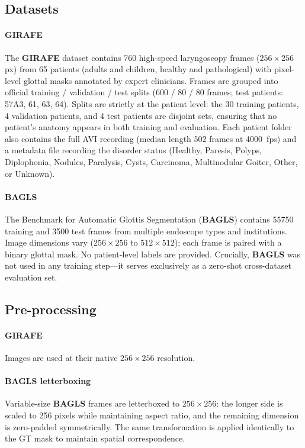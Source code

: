 \documentclass[preprint,12pt]{elsarticle}
\newcommand{\girafe}{\textbf{GIRAFE}}
\newcommand{\bagls}{\textbf{BAGLS}}
\begin{document}
\subsection{Datasets}
\label{sec:datasets}

\paragraph{\girafe{}}
The \girafe{} dataset \cite{andrade2025datainbrief} contains \num{760}
high-speed laryngoscopy frames (\(256\times256\) px) from \num{65} patients
(adults and children, healthy and pathological) with pixel-level glottal masks
annotated by expert clinicians.
Frames are grouped into official training / validation / test splits (\num{600}
/ \num{80} / \num{80} frames; test patients: 57A3, 61, 63, 64).
Splits are strictly at the patient level: the \num{30} training patients,
\num{4} validation patients, and \num{4} test patients are disjoint sets,
ensuring that no patient's anatomy appears in both training and evaluation.
Each patient folder also contains the full AVI recording (median length
\num{502} frames at \SI{4000}{fps}) and a metadata file recording the disorder
status (Healthy, Paresis, Polyps, Diplophonia, Nodules, Paralysis, Cysts,
Carcinoma, Multinodular Goiter, Other, or Unknown).

\paragraph{\bagls{}}
The Benchmark for Automatic Glottis Segmentation (\bagls{}) \cite{gomez2020bagls}
contains \num{55750} training and \num{3500} test frames from multiple
endoscope types and institutions.
Image dimensions vary (\(256\times256\) to \(512\times512\)); each frame is
paired with a binary glottal mask.
No patient-level labels are provided.
Crucially, \bagls{} was not used in any training step---it serves exclusively
as a zero-shot cross-dataset evaluation set.

\subsection{Pre-processing}
\label{sec:preproc}

\paragraph{\girafe{}}
Images are used at their native \(256\times256\) resolution.

\paragraph{\bagls{} letterboxing}
Variable-size \bagls{} frames are letterboxed to \(256\times256\):
the longer side is scaled to \num{256} pixels while maintaining aspect ratio,
and the remaining dimension is zero-padded symmetrically.
The same transformation is applied identically to the GT mask to maintain
spatial correspondence.
\end{document}
